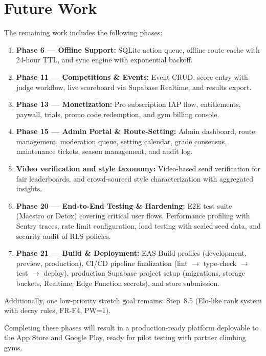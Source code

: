 \documentclass[12pt,a4paper]{report}
\renewcommand\_{\textunderscore\hspace{0pt}}
\begin{document}
\section{Future Work}

The remaining work includes the following phases:

\begin{enumerate}[noitemsep]
    \item \textbf{Phase 6 --- Offline Support:} SQLite action queue, offline route cache with 24-hour TTL, and sync engine with exponential backoff.
    \item \textbf{Phase 11 --- Competitions \& Events:} Event CRUD, score entry with judge workflow, live scoreboard via Supabase Realtime, and results export.
    \item \textbf{Phase 13 --- Monetization:} Pro subscription IAP flow, entitlements, paywall, trials, promo code redemption, and gym billing console.
    \item \textbf{Phase 15 --- Admin Portal \& Route-Setting:} Admin dashboard, route management, moderation queue, setting calendar, grade consensus, maintenance tickets, season management, and audit log.
    \item \textbf{Video verification and style taxonomy:} Video-based send verification for fair leaderboards, and crowd-sourced style characterization with aggregated insights.
    \item \textbf{Phase 20 --- End-to-End Testing \& Hardening:} E2E test suite (Maestro or Detox) covering critical user flows. Performance profiling with Sentry traces, rate limit configuration, load testing with scaled seed data, and security audit of RLS policies.
    \item \textbf{Phase 21 --- Build \& Deployment:} EAS Build profiles (development, preview, production), CI/CD pipeline finalization (lint $\rightarrow$ type-check $\rightarrow$ test $\rightarrow$ deploy), production Supabase project setup (migrations, storage buckets, Realtime, Edge Function secrets), and store submission.
\end{enumerate}

Additionally, one low-priority stretch goal remains: Step~8.5 (Elo-like rank system with decay rules, FR-F4, PW=1).

Completing these phases will result in a production-ready platform deployable to the App Store and Google Play, ready for pilot testing with partner climbing gyms.

\clearpage
{}
\end{document}
